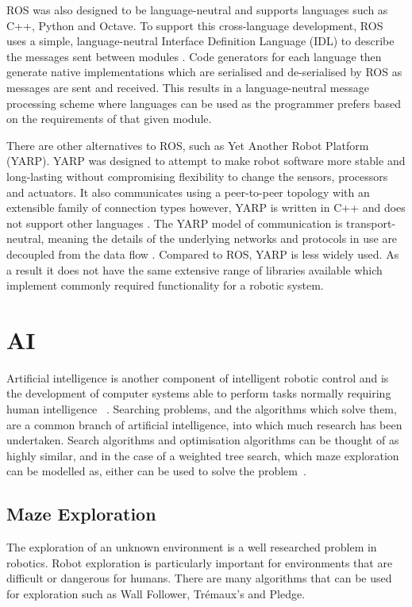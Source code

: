 ROS was also designed to be language-neutral and supports languages 
such as C++, Python and Octave. To support this cross-language 
development, ROS uses a simple, language-neutral Interface Definition 
Language (IDL) to describe the messages sent between modules 
\cite{quigley2009ros}. Code generators for each language then generate 
native implementations which are serialised and de-serialised by ROS 
as messages are sent and received. This results in a language-neutral 
message processing scheme where languages can be used as the programmer 
prefers based on the requirements of that given module. 

There are other alternatives to ROS, such as Yet Another Robot Platform 
(YARP). YARP was designed to attempt to make robot software more stable 
and long-lasting without compromising flexibility to change the sensors, 
processors and actuators. It also communicates using a peer-to-peer 
topology with an extensible family of connection types however, YARP is 
written in C++ and does not support other languages \cite{aboutYARP}.
The YARP model of communication is transport-neutral, meaning the details 
of the underlying networks and protocols in use are decoupled from the 
data flow \cite{exactlyIsYARP}. Compared to ROS, YARP is less widely used.
As a result it does not have the same extensive range of libraries available 
which implement commonly required functionality for a robotic system.

\section{AI}\label{litreview/maze}
Artificial intelligence is another component of intelligent robotic control and is the 
development of computer systems able to perform tasks normally requiring human intelligence~
\cite{russell2016artificial}. Searching problems, and the algorithms which solve them, are a 
common branch of artificial intelligence, into which much research has been undertaken. Search 
algorithms and optimisation algorithms can be thought of as highly similar, and in the case of 
a weighted tree search, which maze exploration can be modelled as, either can be used to solve the problem~\cite{kanal2012search}. 

\subsection{Maze Exploration}\label{litreview/maze/exploration}
The exploration of an unknown environment is a well researched problem in 
robotics. Robot exploration is particularly important for 
environments that are difficult or dangerous for humans. There are many
algorithms that can be used for exploration such as Wall Follower, 
Trémaux's and Pledge.

